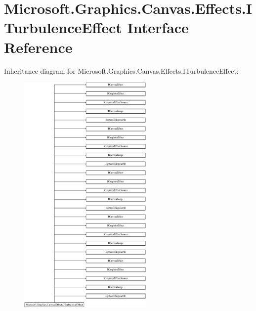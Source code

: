 \hypertarget{interface_microsoft_1_1_graphics_1_1_canvas_1_1_effects_1_1_i_turbulence_effect}{}\section{Microsoft.\+Graphics.\+Canvas.\+Effects.\+I\+Turbulence\+Effect Interface Reference}
\label{interface_microsoft_1_1_graphics_1_1_canvas_1_1_effects_1_1_i_turbulence_effect}
Inheritance diagram for Microsoft.\+Graphics.\+Canvas.\+Effects.\+I\+Turbulence\+Effect\+:\begin{figure}[H]
\begin{center}
\leavevmode
\includegraphics[height=12.000000cm]{interface_microsoft_1_1_graphics_1_1_canvas_1_1_effects_1_1_i_turbulence_effect}
\end{center}
\end{figure}
